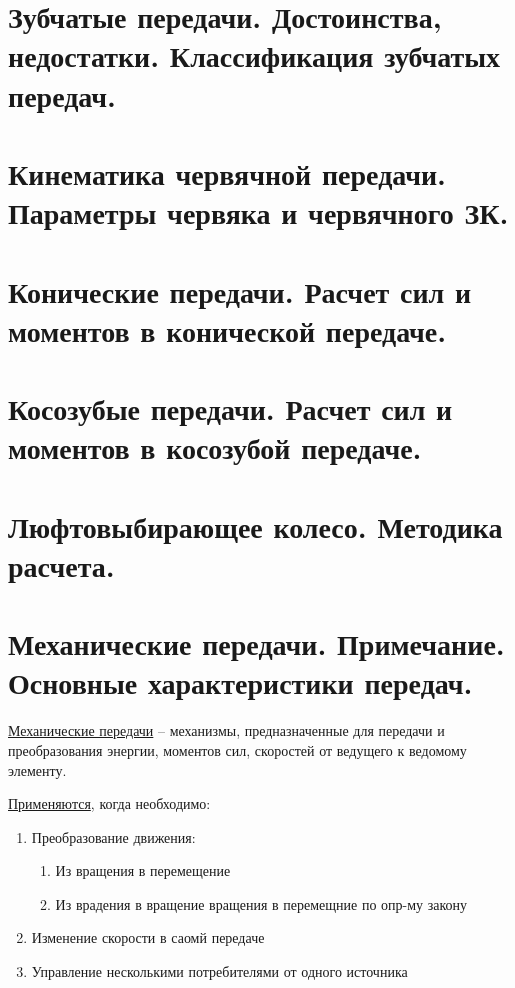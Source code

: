 \documentclass{article}
\begin{document}
\section {Зубчатые передачи. Достоинства, недостатки. Классификация зубчатых передач.}

\section {Кинематика червячной передачи. Параметры червяка и червячного ЗК.}

\section {Конические передачи. Расчет сил и моментов в конической передаче.}

\section {Косозубые передачи. Расчет сил и моментов в косозубой передаче.}

\section {Люфтовыбирающее колесо. Методика расчета.}

\section {Механические передачи. Примечание. Основные характеристики передач.}

\underline{Механические передачи}  -- механизмы, предназначенные для передачи и преобразования 
энергии, моментов сил, скоростей от ведущего к ведомому элементу.

\underline{Применяются}, когда необходимо:
\begin{enumerate}
	\item Преобразование движения:
	\begin{enumerate}
		\item Из вращения в перемещение
		\item Из врадения в вращение
		 вращения в перемещние по опр-му закону
	\end{enumerate}
	\item Изменение скорости в саомй передаче
	\item Управление несколькими потребителями от одного источника
\end{enumerate}
\end{document}

